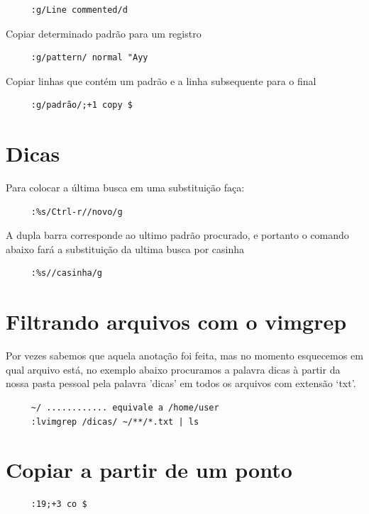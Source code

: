 \documentclass[10pt,a4paper,openany]{book}
\begin{document}
\begin{verbatim}
     :g/Line commented/d
\end{verbatim}

Copiar determinado padrão para um registro

\begin{verbatim}
     :g/pattern/ normal "Ayy
\end{verbatim}

Copiar linhas que contém um padrão e a linha subsequente para o final

\begin{verbatim}
     :g/padrão/;+1 copy $
\end{verbatim}

\section{Dicas }
Para colocar a última busca em uma substituição faça:

\begin{verbatim}
     :%s/Ctrl-r//novo/g
\end{verbatim}

A dupla barra corresponde ao ultimo padrão procurado, e portanto o
comando abaixo fará a substituição da ultima busca por casinha

\begin{verbatim}
     :%s//casinha/g
\end{verbatim}

\section{Filtrando arquivos com o vimgrep}
\label{Filtrando arquivos com o vimgrep}

Por vezes sabemos que aquela anotação foi feita, mas no momento esquecemos em qual
arquivo está, no exemplo abaixo procuramos a palavra dicas à partir da nossa pasta pessoal
pela palavra 'dicas' em todos os arquivos com extensão `txt'.

\begin{verbatim}
     ~/ ............ equivale a /home/user
     :lvimgrep /dicas/ ~/**/*.txt | ls
\end{verbatim}


\section{Copiar a partir de um ponto}

\begin{verbatim}
     :19;+3 co $
\end{verbatim}
\end{document}
